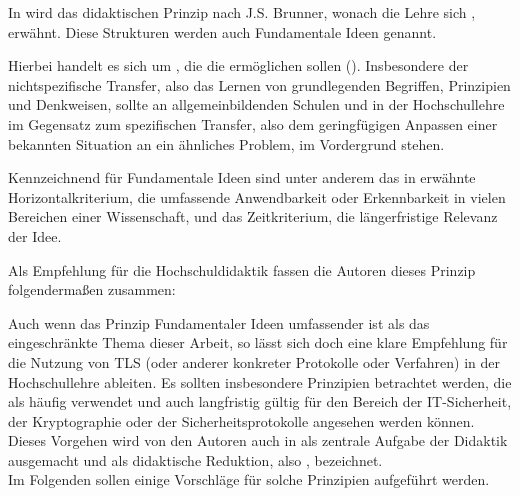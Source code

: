 In \cite{schubert11} wird das didaktischen Prinzip nach J.S. Brunner, wonach die Lehre sich , erwähnt. Diese Strukturen werden auch Fundamentale Ideen genannt.

Hierbei handelt es sich um , die die  ermöglichen sollen (\cite{schubert11}). Insbesondere der nichtspezifische Transfer, also das Lernen von grundlegenden Begriffen, Prinzipien und Denkweisen, sollte an allgemeinbildenden Schulen und in der Hochschullehre im Gegensatz zum spezifischen Transfer, also dem geringfügigen Anpassen einer bekannten Situation an ein ähnliches Problem, im Vordergrund stehen.

Kennzeichnend für Fundamentale Ideen sind unter anderem das in \cite{schubert11} erwähnte Horizontalkriterium, die umfassende Anwendbarkeit oder Erkennbarkeit in vielen Bereichen einer Wissenschaft, und das Zeitkriterium, die längerfristige Relevanz der Idee. 

Als Empfehlung für die Hochschuldidaktik fassen die Autoren dieses Prinzip folgendermaßen zusammen:\\
\begin{quote}
 \cite{schubert11}
\end{quote}

Auch wenn das Prinzip Fundamentaler Ideen umfassender ist als das eingeschränkte Thema dieser Arbeit, so lässt sich doch eine klare Empfehlung für die Nutzung von TLS (oder anderer konkreter Protokolle oder Verfahren) in der Hochschullehre ableiten. Es sollten  insbesondere Prinzipien betrachtet werden, die als häufig verwendet und auch langfristig gültig für den Bereich der IT-Sicherheit, der Kryptographie oder der Sicherheitsprotokolle angesehen werden können.\\
Dieses Vorgehen wird von den Autoren auch in \cite{kluever12} als zentrale Aufgabe der Didaktik ausgemacht und als didaktische Reduktion, also , bezeichnet.\\
Im Folgenden sollen einige Vorschläge für solche Prinzipien aufgeführt werden.

